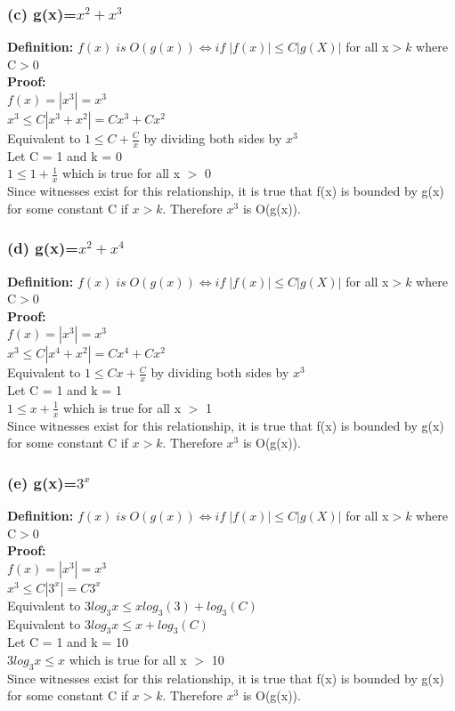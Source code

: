 \documentclass{article}
\begin{document}
\subsubsection[c]{(c) g(x)=$x^2 + x^3$}
\textbf{Definition: }$f(x) \; is \;O(g(x)) \Longleftrightarrow if \; |f(x)| \leq C|g(X)|$ for all x$>k$ where C$>$0\\
\textbf{Proof:}\\
$f(x) = |x^3| = x^3$\\
$x^3 \leq C|x^3 + x^2| = Cx^3 + Cx^2$\\
Equivalent to $1\leq C + \frac{C}{x}$ by dividing both sides by $x^3$\\
Let C = 1 and k = 0\\
$1 \leq 1 + \frac{1}{x}$ which is true for all x $>$ 0\\
Since witnesses exist for this relationship, it is true that f(x) is bounded by g(x) for some constant C if $x>k$. Therefore $x^3$ is O(g(x)).

\subsubsection[d]{(d) g(x)=$x^2 + x^4$}
\textbf{Definition: }$f(x) \; is \;O(g(x)) \Longleftrightarrow if \; |f(x)| \leq C|g(X)|$ for all x$>k$ where C$>$0\\
\textbf{Proof:}\\
$f(x) = |x^3| = x^3$\\
$x^3 \leq C|x^4 + x^2| = Cx^4 + Cx^2$\\
Equivalent to $1\leq Cx + \frac{C}{x}$ by dividing both sides by $x^3$\\
Let C = 1 and k = 1\\
$1 \leq x + \frac{1}{x}$ which is true for all x $>$ 1\\
Since witnesses exist for this relationship, it is true that f(x) is bounded by g(x) for some constant C if $x>k$. Therefore $x^3$ is O(g(x)).

\subsubsection[e]{(e) g(x)=$3^x$}
\textbf{Definition: }$f(x) \; is \;O(g(x)) \Longleftrightarrow if \; |f(x)| \leq C|g(X)|$ for all x$>k$ where C$>$0\\
\textbf{Proof:}\\
$f(x) = |x^3| = x^3$\\
$x^3 \leq C|3^x| = C3^x$\\
Equivalent to $3log_3x \leq xlog_3(3) + log_3(C)$ \\
Equivalent to $3log_3x \leq x + log_3(C)$\\
Let C = 1 and k = 10\\
$3log_3x \leq x $ which is true for all x $>$ 10\\
Since witnesses exist for this relationship, it is true that f(x) is bounded by g(x) for some constant C if $x>k$. Therefore $x^3$ is O(g(x)).
\end{document}
